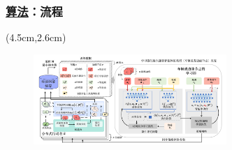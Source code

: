 \begin{frame}
\begin{overlayarea}{\textwidth}{3cm}

\end{overlayarea}
\end{frame}


\begin{frame}
\frametitle{\englishfont \underline{算法}：流程}
\newBackground
\begin{center}
\begin{textblock*}{\textwidth}(4.5cm,2.6cm)
\begin{figure}
\includegraphics[width=0.65\textwidth]{fig/Fig4-2-solution-model.pdf}
\end{figure}
\end{textblock*}
\end{center}


\end{frame}

